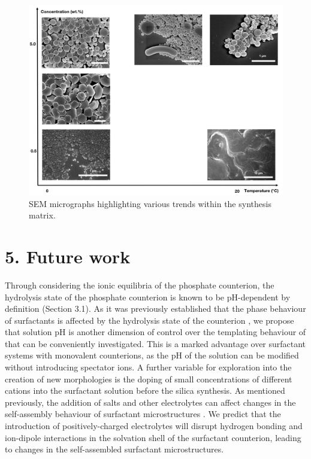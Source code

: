 \documentclass[a4paper,12pt,twocolumn]{article}
\begin{document}
	 	\begin{figure}[!b]
  	 	\centering
		\includegraphics[width=\linewidth]{trends.jpg}
  		\caption{SEM micrographs highlighting various trends within the synthesis matrix.}
  	\end{figure}

	 
	 \section{5. Future work}
	 
	 Through considering the ionic equilibria of the phosphate counterion, the hydrolysis state of the phosphate counterion is known to be pH-dependent by definition (Section 3.1). As it was previously established that the phase behaviour of  surfactants is affected by the hydrolysis state of the counterion \cite{liu2014}, we propose that solution pH is another dimension of control over the templating behaviour of  that can be conveniently investigated. This is a marked advantage over surfactant systems with monovalent counterions, as the pH of the solution can be modified without introducing spectator ions. A further variable for exploration into the creation of new morphologies is the doping of small concentrations of different cations into the surfactant solution before the silica synthesis. As mentioned previously, the addition of salts and other electrolytes can affect changes in the self-assembly behaviour of surfactant microstructures \cite{thalberg1991}. We predict that the introduction of positively-charged electrolytes will disrupt hydrogen bonding and ion-dipole interactions in the solvation shell of the surfactant counterion, leading to changes in the self-assembled surfactant microstructures.
	
\end{document}
